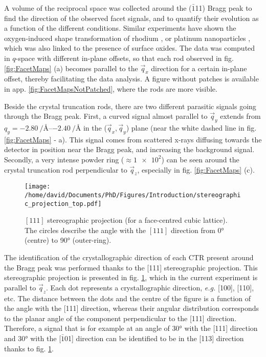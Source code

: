 A volume of the reciprocal space was collected around the ($\bar{1}$11) Bragg peak to find the direction of the observed facet signals, and to quantify their evolution as a function of the different conditions.
Similar experiments have shown the oxygen-induced shape transformation of rhodium \parencite{Nolte2008}, or platinum nanoparticles \parencite{Hejral2013}, which was also linked to the presence of surface oxides.
The data was computed in $q$-space with different in-plane offsets, so that each rod observed in fig. \ref{fig:FacetMaps} (a) becomes parallel to the $\vec{q}_x$ direction for a certain in-plane offset, thereby facilitating the data analysis.
A figure without patches is available in app. \ref{fig:FacetMapsNotPatched}, where the rods are more visible.

Beside the crystal truncation rods, there are two different parasitic signals going through the Bragg peak.
First, a curved signal almost parallel to $\vec{q}_y$ extends from $q_y = \qtyrange{-2.80}{-2.40}{\per\angstrom}$ in the ($\vec{q}_x, \vec{q}_y$) plane (near the white dashed line in fig. \ref{fig:FacetMaps} - a).
This signal comes from scattered x-rays diffusing towards the detector in position near the Bragg peak, and increasing the background signal.
Secondly, a very intense powder ring ($\approx \num{1e2}$) can be seen around the crystal truncation rod perpendicular to $\vec{q}_z$, especially in fig. \ref{fig:FacetMaps} (c).

\begin{figure}[!htb]
    \centering
    \texttt{[image: /home/david/Documents/PhD/Figures/Introduction/stereographic\_projection\_top.pdf]}
    \caption{
        $[111]$ stereographic projection (for a face-centred cubic lattice).
        The circles describe the angle with the $[111]$ direction from \ang{0} (centre) to \ang{90} (outer-ring).
    }
    \label{fig:StereoTop}
\end{figure}

The identification of the crystallographic direction of each CTR present around the Bragg peak was performed thanks to the [111] stereographic projection.
This stereographic projection is presented in fig. \ref{fig:StereoTop}, which in the current experiment is parallel to $\vec{q}_z$.
Each dot represents a crystallographic direction, \textit{e.g.} [100], [110], etc.
The distance between the dots and the centre of the figure is a function of the angle with the [111] direction, whereas their angular distribution corresponds to the planar angle of the component perpendicular to the [111] direction.
Therefore, a signal that is for example at an angle of \ang{30} with the [111] direction and \ang{30} with the [$\bar{1}$01] direction can be identified to be in the [113] direction thanks to fig. \ref{fig:StereoTop}.

